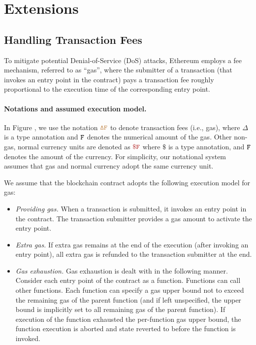 \section{Extensions}

\subsection{Handling Transaction Fees}

To mitigate potential Denial-of-Service (DoS) attacks, 
Ethereum employs a fee mechanism, referred to as ``gas'', 
where the submitter of a transaction (that invokes
an entry point in the contract) pays a  
transaction fee
roughly proportional to the execution time of the 
corresponding entry point.

\paragraph{Notations and assumed execution model.}
In Figure , we
use the notation $\tt {\color{brown} \Delta F }$
to denote transaction fees (i.e., gas), 
where $\Delta$ is a type annotation 
and ${\tt F}$ denotes the numerical amount of the  
gas. Other non-gas, normal currency units 
are denoted as $\smaroon{\$ F}$ where $\$$ is a type annotation,
and ${\tt F}$ denotes the amount of the currency. 
For simplicity, our notational system assumes 
that gas and normal currency adopt
the same currency unit. 

We assume that the blockchain contract adopts the following execution model
for gas:
\begin{itemize}[leftmargin=5mm]
\item
{\it Providing gas.} 
When a transaction is submitted, it invokes an entry point in the contract.
The transaction submitter provides a gas amount to activate the entry point. 
\item
{\it Extra gas.} 
If extra gas remains at the end of the execution (after invoking an entry point),
all extra gas is refunded to the transaction submitter at the end.
\item
{\it Gas exhaustion.} 
Gas exhaustion is dealt with in the following manner.
Consider each entry point of the contract as a function. 
Functions can call other functions.
Each function can specify a gas upper bound not to exceed
the remaining gas of the parent function (and if left unspecified,
the upper bound is implicitly set to all remaining gas of the parent function).
If execution of the function exhausted the per-function gas 
upper bound, the function execution is aborted and 
state reverted to before the function is invoked.
\end{itemize}




